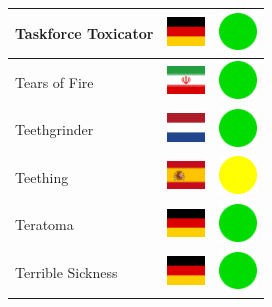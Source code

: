 \documentclass[12pt, a4paper, twoside]{report}
\begin{document}
\begin{center}
\begin{longtable}{|p{5cm}|p{2cm}|p{2cm}|}
 Taskforce Toxicator                                        & \includegraphics[width=1cm]{../img/flags/de} &   \includegraphics[width=1cm]{../likes/y} \\ \hline
 Tears of Fire                                              & \includegraphics[width=1cm]{../img/flags/ir} &   \includegraphics[width=1cm]{../likes/y} \\ \hline
 Teethgrinder                                               & \includegraphics[width=1cm]{../img/flags/nl} &   \includegraphics[width=1cm]{../likes/y} \\ \hline
 Teething                                                   & \includegraphics[width=1cm]{../img/flags/es} &   \includegraphics[width=1cm]{../likes/m} \\ \hline
 Teratoma                                                   & \includegraphics[width=1cm]{../img/flags/de} &   \includegraphics[width=1cm]{../likes/y} \\ \hline
 Terrible Sickness                                          & \includegraphics[width=1cm]{../img/flags/de} &   \includegraphics[width=1cm]{../likes/y} \\ \hline

\end{longtable}
\end{center}
\end{document}
